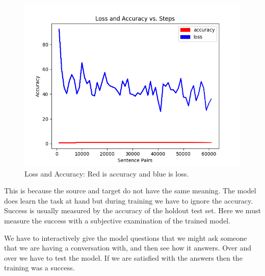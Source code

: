 \begin{figure}[H]
	\begin{center}
	
	\includegraphics[scale=0.5]{Figure_1}
		
\end{center}
	\caption[Loss and Accuracy]{Loss and Accuracy: Red is accuracy and blue is loss.}
	
\end{figure}

This is because the source and target do not have the same meaning. The model does learn the task at hand but during training we have to ignore the accuracy. Success is usually measured by the accuracy of the holdout test set. Here we must measure the success with a subjective examination of the trained model.

We have to interactively give the model questions that we might ask someone that we are having a conversation with, and then see how it answers. Over and over we have to test the model. If we are satisfied with the answers then the training was a success.